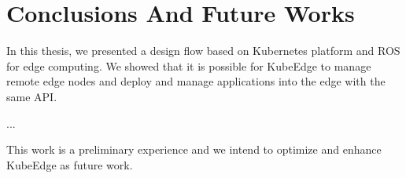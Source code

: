 \chapter*{Conclusions And Future Works}
 
 
 
 
 
 
 
 
 
 
In this thesis, we presented a design flow based on Kubernetes platform and ROS for edge computing. We showed that it is possible for KubeEdge to manage remote edge nodes and deploy and manage applications into the edge with the same API.
% 
% 

...
 
This work is a preliminary experience and we intend to optimize and enhance KubeEdge as future work.
 
% 
 
 
 
 
 
 

\clearpage
\thispagestyle{empty}